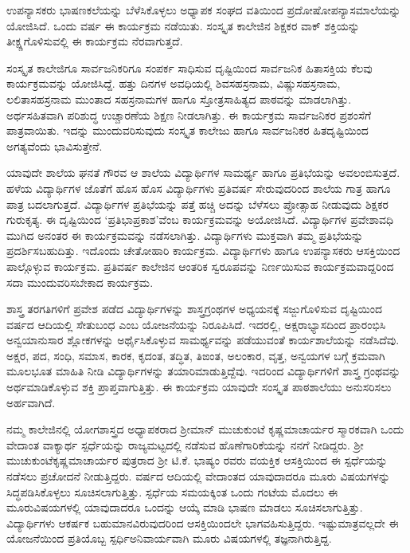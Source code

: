 {ಉಪನ್ಯಾಸಕರು ಭಾಷಣಕಲೆಯನ್ನು ಬೆಳೆಸಿಕೊಳ್ಳಲು ಅಧ್ಯಾಪಕ ಸಂಘದ \hbox{ವತಿಯಿಂದ} ಪ್ರದೋಷೋಪನ್ಯಾಸಮಾಲೆಯನ್ನು ಯೋಜಿಸಿದೆ. ಒಂದು ವರ್ಷ ಈ ಕಾರ್ಯಕ್ರಮ ನಡೆಯಿತು.  ಸಂಸ್ಕೃತ ಕಾಲೇಜಿನ ಶಿಕ್ಷಕರ ವಾಕ್ ಶಕ್ತಿಯನ್ನು ತೀಕ್ಷ್ಣಗೊಳಿಸುವಲ್ಲಿ ಈ ಕಾರ್ಯಕ್ರಮ ನೆರವಾಗುತ್ತದೆ.  

ಸಂಸ್ಕೃತ ಕಾಲೇಜಿಗೂ ಸಾರ್ವಜನಿಕರಿಗೂ ಸಂಪರ್ಕ ಸಾಧಿಸುವ ದೃಷ್ಟಿಯಿಂದ ಸಾರ್ವಜನಿಕ ಹಿತಾಸಕ್ತಿಯ ಕೆಲವು ಕಾರ್ಯಕ್ರಮವನ್ನು ಯೋಜಿಸಿದ್ದೆ.  ಹತ್ತು ದಿನಗಳ ಅವಧಿಯಲ್ಲಿ ಶಿವಸಹಸ್ರನಾಮ, ವಿಷ್ಣುಸಹಸ್ರನಾಮ, ಲಲಿತಾಸಹಸ್ರನಾಮ ಮುಂತಾದ ಸಹಸ್ರನಾಮಗಳ ಹಾಗೂ ಸ್ತೋತ್ರಸಾಹಿತ್ಯದ ಪಾಠವನ್ನು ಮಾಡಲಾಗಿತ್ತು.  ಅರ್ಥಸಹಿತವಾಗಿ ಪರಿಶುದ್ಧ ಉಚ್ಚಾರಣೆಯ ಶಿಕ್ಷಣ ನೀಡಲಾಗಿತ್ತು.  ಈ ಕಾರ್ಯಕ್ರಮ ಸಾರ್ವಜನಿಕರ ಪ್ರಶಂಸೆಗೆ ಪಾತ್ರವಾಯಿತು.  ಇದನ್ನು ಮುಂದುವರಿಸುವುದು ಸಂಸ್ಕೃತ ಕಾಲೇಜು ಹಾಗೂ ಸಾರ್ವಜನಿಕರ ಹಿತದೃಷ್ಟಿಯಿಂದ ಅಗತ್ಯವೆಂದು ಭಾವಿಸುತ್ತೇನೆ.  

ಯಾವುದೇ ಶಾಲೆಯ ಘನತೆ ಗೌರವ ಆ ಶಾಲೆಯ ವಿದ್ಯಾರ್ಥಿಗಳ ಸಾಮರ್ಥ್ಯ ಹಾಗೂ ಪ್ರತಿಭೆಯನ್ನು ಅವಲಂಬಿಸುತ್ತದೆ.   ಹಳೆಯ ವಿದ್ಯಾರ್ಥಿಗಳ ಜೊತೆಗೆ ಹೊಸ ಹೊಸ ವಿದ್ಯಾರ್ಥಿಗಳು ಪ್ರತಿವರ್ಷ ಸೇರುವುದರಿಂದ ಶಾಲೆಯ ಗಾತ್ರ ಹಾಗೂ ಪಾತ್ರ ಬದಲಾಗುತ್ತದೆ.  ವಿದ್ಯಾರ್ಥಿಗಳ ಪ್ರತಿಭೆಯನ್ನು ಪತ್ತೆ ಹಚ್ಚಿ ಅದನ್ನು ಬೆಳೆಸಲು ಪ್ರೋತ್ಸಾಹ ನೀಡುವುದು ಶಿಕ್ಷಕರ ಗುರುಕೃತ್ಯ.  ಈ ದೃಷ್ಟಿಯಿಂದ ‘ಪ್ರತಿಭಾಪ್ರಕಾಶ’ವೆಂಬ ಕಾರ್ಯಕ್ರಮವನ್ನು ಅಯೋಜಿಸಿದೆ.  ವಿದ್ಯಾರ್ಥಿಗಳ ಪ್ರವೇಶಾವಧಿ ಮುಗಿದ ಅನಂತರ ಈ ಕಾರ್ಯಕ್ರಮ\-ವನ್ನು ನಡೆಸಲಾಗಿತ್ತು.  ವಿದ್ಯಾರ್ಥಿಗಳು ಮುಕ್ತವಾಗಿ ತಮ್ಮ ಪ್ರತಿಭೆಯನ್ನು ಪ್ರದರ್ಶಿಸಬಹುದಿತ್ತು.  ಇದೊಂದು ಚೇತೋಹಾರಿ ಕಾರ್ಯಕ್ರಮ.  ವಿದ್ಯಾರ್ಥಿಗಳು ಹಾಗೂ ಉಪನ್ಯಾಸಕರು ಆಸಕ್ತಿಯಿಂದ ಪಾಲ್ಗೊಳ್ಳುವ ಕಾರ್ಯಕ್ರಮ.  ಪ್ರತಿವರ್ಷ ಕಾಲೇಜಿನ ಆಂತರಿಕ ಸ್ವರೂಪವನ್ನು ನಿರ್ಣಯಿಸುವ ಕಾರ್ಯಕ್ರಮವಾದ್ದರಿಂದ ಸದಾ ಮುಂದುವರಿಸ\-ಬೇಕಾದ ಕಾರ್ಯಕ್ರಮ.

ಶಾಸ್ತ್ರ ತರಗತಿಗಳಿಗೆ ಪ್ರವೇಶ ಪಡೆದ ವಿದ್ಯಾರ್ಥಿಗಳನ್ನು ಶಾಸ್ತ್ರಗ್ರಂಥಗಳ ಅಧ್ಯಯ\-ನಕ್ಕೆ ಸಜ್ಜುಗೊಳಿಸುವ ದೃಷ್ಟಿಯಿಂದ ವರ್ಷದ ಆದಿಯಲ್ಲಿ ಸೇತುಬಂಧ ಎಂಬ ಯೋಜನೆ\-ಯನ್ನು ನಿರೂಪಿಸಿದೆ.  ಇದರಲ್ಲಿ, ಅಕ್ಷರಾಭ್ಯಾಸದಿಂದ ಪ್ರಾರಂಭಿಸಿ ಅನ್ವಯಾನು\-ಸಾರ ಶ್ಲೋಕಗಳನ್ನು ಅರ್ಥೈಸಿಕೊಳ್ಳುವ ಸಾಮರ್ಥ್ಯವನ್ನು ಪಡೆಯುವಂತೆ ಕಾರ್ಯಶಾಲೆಯನ್ನು ನಡೆಸಿದೆವು.  ಅಕ್ಷರ, ಪದ, ಸಂಧಿ, ಸಮಾಸ, ಕಾರಕ, ಕೃದಂತ, ತದ್ಧಿತ, ತಿಙಂತ, ಅಲಂಕಾರ, ವೃತ್ತ, ಅನ್ವಯಗಳ ಬಗ್ಗೆ ಕ್ರಮವಾಗಿ ಮೂಲಭೂತ ಮಾಹಿತಿ ನೀಡಿ ವಿದ್ಯಾರ್ಥಿ\-ಗಳನ್ನು ತಯಾರಿಮಾಡುತ್ತಿದ್ದೆವು. ಇದರಿಂದ ವಿದ್ಯಾರ್ಥಿಗಳಿಗೆ ಶಾಸ್ತ್ರ ಗ್ರಂಥವನ್ನು ಅರ್ಥಮಾಡಿಕೊಳ್ಳುವ ಶಕ್ತಿ ಪ್ರಾಪ್ತವಾಗುತ್ತಿತ್ತು.  ಈ ಕಾರ್ಯಕ್ರಮ ಯಾವುದೇ ಸಂಸ್ಕೃತ ಪಾಠಶಾಲೆಯು ಅನುಸರಿಸಲು ಅರ್ಹವಾಗಿದೆ.  

ನಮ್ಮ ಕಾಲೇಜಿನಲ್ಲಿ ಯೋಗಶಾಸ್ತ್ರದ ಅಧ್ಯಾಪಕರಾದ ಶ್ರೀಮಾನ್ ಮುಚುಕುಂಟೆ ಕೃಷ್ಣಮಾಚಾರ್ಯರ ಸ್ಮಾರಕವಾಗಿ ಒಂದು ವೇದಾಂತ ವಾಕ್ಯಾರ್ಥ ಸ್ಪರ್ಧೆಯನ್ನು ರಾಜ್ಯಮಟ್ಟದಲ್ಲಿ ನಡೆಸುವ ಹೊಣೆಗಾರಿಕೆಯನ್ನು ನನಗೆ ನೀಡಿದ್ದರು.  ಶ್ರೀ ಮುಚುಕುಂಟೆ\break ಕೃಷ್ಣಮಾಚಾರ್ಯರ ಪುತ್ರರಾದ ಶ್ರೀ ಟಿ.ಕೆ. ಭಾಷ್ಯಂ ರವರು ವಯಕ್ತಿಕ \hbox{ಆಸಕ್ತಿಯಿಂದ} ಈ ಸ್ಪರ್ಧೆಯನ್ನು ನಡೆಸಲು ಪ್ರಚೋದನೆ ನೀಡುತ್ತಿದ್ದರು.  ವರ್ಷದ ಆದಿಯಲ್ಲಿ \hbox{ವೇದಾಂತದ} ಯಾವುದಾದರೂ ಮೂರು ವಿಷಯಗಳನ್ನು ಸಿದ್ಧಪಡಿಸಿಕೊಳ್ಳಲು ಸೂಚಿಸಲಾಗುತ್ತಿತ್ತು.   ಸ್ಪರ್ಧೆಯ ಸಮಯಕ್ಕಿಂತ ಒಂದು ಗಂಟೆಯ ಮೊದಲು ಈ ಮೂರು\break ವಿಷಯಗಳಲ್ಲಿ ಯಾವುದಾದರೂ ಒಂದನ್ನು ಆಯ್ಕೆ ಮಾಡಿ ಭಾಷಣ ಮಾಡಲು ಸೂಚಿಸಲಾಗುತ್ತಿತ್ತು.  ವಿದ್ಯಾರ್ಥಿಗಳು ಆಕರ್ಷಕ ಬಹುಮಾನವಿರುವುದರಿಂದ \hbox{ಆಸಕ್ತಿಯಿಂದಲೇ} ಭಾಗವಹಿಸುತ್ತಿದ್ದರು.  ಇಷ್ಟುಮಾತ್ರವಲ್ಲದೇ ಈ ಯೋಜನೆಯಿಂದ ಪ್ರತಿಯೊಬ್ಬ ಸ್ಪರ್ಧಿ\break ಅನಿವಾರ್ಯವಾಗಿ ಮೂರು ವಿಷಯಗಳಲ್ಲಿ ತಜ್ಞನಾಗಿರುತ್ತಿದ್ದ.  

}
